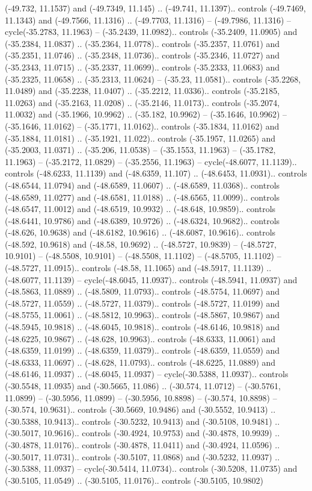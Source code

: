 \begin{scope}[shift={(2.5552, 9.9912)}]
\begin{scope}[shift={(48.1654, -14.8546)}]
(-49.732, 11.1537) and (-49.7349, 11.145) .. (-49.741, 11.1397).. controls (-49.7469, 11.1343) and (-49.7566, 11.1316) .. (-49.7703, 11.1316) -- (-49.7986, 11.1316) -- cycle(-35.2783, 11.1963) -- (-35.2439, 11.0982).. controls (-35.2409, 11.0905) and (-35.2384, 11.0837) .. (-35.2364, 11.0778).. controls (-35.2357, 11.0761) and (-35.2351, 11.0746) .. (-35.2348, 11.0736).. controls (-35.2346, 11.0727) and (-35.2343, 11.0715) .. (-35.2337, 11.0699).. controls (-35.2333, 11.0683) and (-35.2325, 11.0658) .. (-35.2313, 11.0624) -- (-35.23, 11.0581).. controls (-35.2268, 11.0489) and (-35.2238, 11.0407) .. (-35.2212, 11.0336).. controls (-35.2185, 11.0263) and (-35.2163, 11.0208) .. (-35.2146, 11.0173).. controls (-35.2074, 11.0032) and (-35.1966, 10.9962) .. (-35.182, 10.9962) -- (-35.1646, 10.9962) -- (-35.1646, 11.0162) -- (-35.1771, 11.0162).. controls (-35.1834, 11.0162) and (-35.1884, 11.0181) .. (-35.1921, 11.022).. controls (-35.1957, 11.0265) and (-35.2003, 11.0371) .. (-35.206, 11.0538) -- (-35.1553, 11.1963) -- (-35.1782, 11.1963) -- (-35.2172, 11.0829) -- (-35.2556, 11.1963) -- cycle(-48.6077, 11.1139).. controls (-48.6233, 11.1139) and (-48.6359, 11.107) .. (-48.6453, 11.0931).. controls (-48.6544, 11.0794) and (-48.6589, 11.0607) .. (-48.6589, 11.0368).. controls (-48.6589, 11.0277) and (-48.6581, 11.0188) .. (-48.6565, 11.0099).. controls (-48.6547, 11.0012) and (-48.6519, 10.9932) .. (-48.648, 10.9859).. controls (-48.6441, 10.9786) and (-48.6389, 10.9726) .. (-48.6324, 10.9682).. controls (-48.626, 10.9638) and (-48.6182, 10.9616) .. (-48.6087, 10.9616).. controls (-48.592, 10.9618) and (-48.58, 10.9692) .. (-48.5727, 10.9839) -- (-48.5727, 10.9101) -- (-48.5508, 10.9101) -- (-48.5508, 11.1102) -- (-48.5705, 11.1102) -- (-48.5727, 11.0915).. controls (-48.58, 11.1065) and (-48.5917, 11.1139) .. (-48.6077, 11.1139) -- cycle(-48.6045, 11.0937).. controls (-48.5941, 11.0937) and (-48.5863, 11.0889) .. (-48.5809, 11.0793).. controls (-48.5754, 11.0697) and (-48.5727, 11.0559) .. (-48.5727, 11.0379).. controls (-48.5727, 11.0199) and (-48.5755, 11.0061) .. (-48.5812, 10.9963).. controls (-48.5867, 10.9867) and (-48.5945, 10.9818) .. (-48.6045, 10.9818).. controls (-48.6146, 10.9818) and (-48.6225, 10.9867) .. (-48.628, 10.9963).. controls (-48.6333, 11.0061) and (-48.6359, 11.0199) .. (-48.6359, 11.0379).. controls (-48.6359, 11.0559) and (-48.6333, 11.0697) .. (-48.628, 11.0793).. controls (-48.6225, 11.0889) and (-48.6146, 11.0937) .. (-48.6045, 11.0937) -- cycle(-30.5388, 11.0937).. controls (-30.5548, 11.0935) and (-30.5665, 11.086) .. (-30.574, 11.0712) -- (-30.5761, 11.0899) -- (-30.5956, 11.0899) -- (-30.5956, 10.8898) -- (-30.574, 10.8898) -- (-30.574, 10.9631).. controls (-30.5669, 10.9486) and (-30.5552, 10.9413) .. (-30.5388, 10.9413).. controls (-30.5232, 10.9413) and (-30.5108, 10.9481) .. (-30.5017, 10.9616).. controls (-30.4924, 10.9753) and (-30.4878, 10.9939) .. (-30.4878, 11.0176).. controls (-30.4878, 11.0411) and (-30.4924, 11.0596) .. (-30.5017, 11.0731).. controls (-30.5107, 11.0868) and (-30.5232, 11.0937) .. (-30.5388, 11.0937) -- cycle(-30.5414, 11.0734).. controls (-30.5208, 11.0735) and (-30.5105, 11.0549) .. (-30.5105, 11.0176).. controls (-30.5105, 10.9802) 
\end{scope}
\end{scope}
